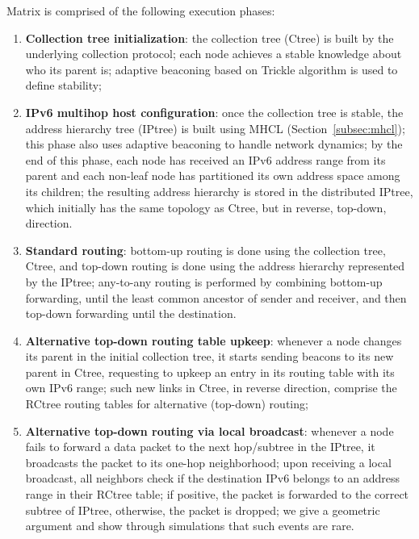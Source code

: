 Matrix is comprised of the following execution phases:
\begin{enumerate}
  \item \textbf{Collection tree initialization}: the
  collection tree (Ctree) is built by the underlying collection protocol; each
  node achieves a stable knowledge about who its parent is; adaptive beaconing
  based on Trickle algorithm \cite{Levis:2004} is used to define stability;
  
 \item \textbf{IPv6 multihop host configuration}: once the collection tree
  is stable, the address hierarchy tree (IPtree) is built using MHCL
  (Section~\ref{subsec:mhcl}); this phase also uses adaptive beaconing to handle network
  dynamics; by the end of this phase, each node has received an IPv6 address
  range from its parent and each non-leaf node has partitioned its own address 
	space among its children; the resulting address
  hierarchy is stored in the distributed IPtree, which initially has the same
  topology as Ctree, but in reverse, top-down, direction.
  
\item \textbf{Standard routing}: bottom-up routing is done
  using the collection tree, Ctree, and top-down routing is done using the
  address hierarchy represented by the IPtree; any-to-any routing is performed by combining
  bottom-up forwarding, until the least common ancestor of sender and
  receiver, and then top-down forwarding until the destination.
  
\item \textbf{Alternative top-down routing table upkeep}: whenever a node changes its parent in the initial collection tree, it starts sending beacons to its new parent in Ctree, requesting to upkeep an entry in its routing table with its own IPv6 range; such new links in Ctree, in reverse direction, comprise the RCtree routing tables for alternative (top-down) routing;

\item \textbf{Alternative top-down routing via local broadcast}:
whenever a node fails to forward a data packet to the next hop/subtree in the IPtree, it
  broadcasts the packet to its one-hop neighborhood; upon receiving a local
  broadcast, all neighbors check if the destination IPv6 belongs to an address
  range in their RCtree table; if positive, the packet is forwarded to the
  correct subtree of IPtree, otherwise, the packet is dropped; we give a
  geometric argument and show through simulations that such events are rare.
\end{enumerate}

